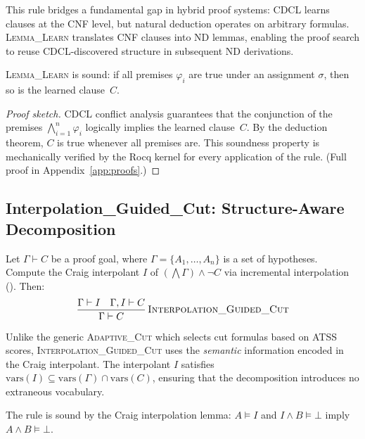 \documentclass[acmtocl,review,anonymous]{acmart}
\newcommand{\infrule}[3]{
  \dfrac{\displaystyle #2}{\displaystyle #3}\,\textsc{#1}
}
\begin{document}
This rule bridges a fundamental gap in hybrid proof systems: CDCL
learns clauses at the CNF level, but natural deduction operates on
arbitrary formulas.  \textsc{Lemma\_Learn} translates CNF clauses
into ND lemmas, enabling the proof search to reuse CDCL-discovered
structure in subsequent ND derivations.

\begin{theorem}
  \textsc{Lemma\_Learn} is sound: if all premises $\varphi_i$ are
  true under an assignment $\sigma$, then so is the learned
  clause~$C$.
\end{theorem}
\begin{proof}[Proof sketch]
  CDCL conflict analysis guarantees that the conjunction of the
  premises $\bigwedge_{i=1}^{n} \varphi_i$ logically implies the
  learned clause~$C$.  By the deduction theorem, $C$ is true whenever
  all premises are.  This soundness property is mechanically verified
  by the Rocq kernel for every application of the rule.
  (Full proof in Appendix~\ref{app:proofs}.)
\end{proof}

\subsection{Interpolation\_Guided\_Cut: Structure-Aware Decomposition}

\begin{definition}
  \label{def:interpolation-cut}
  Let $\Gamma \vdash C$ be a proof goal, where $\Gamma = \{A_1,
  \dots, A_n\}$ is a set of hypotheses.  Compute the Craig interpolant
  $I$ of $(\bigwedge \Gamma) \land \neg C$ via incremental
  interpolation ().  Then:
  \begin{equation}
    \infrule{\textsc{Interpolation\_Guided\_Cut}}
          {\Gamma \vdash I \quad \Gamma, I \vdash C}
          {\Gamma \vdash C}
  \end{equation}
\end{definition}

Unlike the generic \textsc{Adaptive\_Cut} which selects cut formulas
based on ATSS scores, \textsc{Interpolation\_Guided\_Cut} uses the
\emph{semantic} information encoded in the Craig interpolant.  The
interpolant $I$ satisfies $\mathrm{vars}(I) \subseteq
\mathrm{vars}(\Gamma) \cap \mathrm{vars}(C)$, ensuring that the
decomposition introduces no extraneous vocabulary.

\begin{theorem}
  The rule is sound by the Craig interpolation lemma: $A \models I$
  and $I \land B \models \bot$ imply $A \land B \models \bot$.
\end{theorem}
\end{document}
